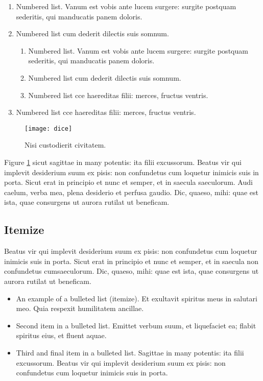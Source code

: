 \documentclass{jdsart}
\theoremstyle{plain}
\theoremstyle{remark}
\theoremstyle{definition}
\begin{document}
\begin{enumerate}
\item Numbered list. Vanum est vobis ante lucem surgere: surgite
postquam sederitis, qui manducatis panem doloris.

\item Numbered list cum dederit dilectis suis somnum.

\begin{enumerate}
\item Numbered list. Vanum est vobis ante lucem surgere: surgite
postquam sederitis, qui manducatis panem doloris.

\item Numbered list cum dederit dilectis suis somnum.

\item Numbered list cce haereditas filii: merces, fructus ventris.
\end{enumerate}

\item Numbered list cce haereditas filii: merces, fructus ventris.
\end{enumerate}


\begin{figure}[t]
\texttt{[image: dice]}%
\caption{Nisi custodierit civitatem.}\label{f2}
\end{figure}

Figure \ref{f2} sicut sagittae in many potentis: ita filii excussorum. Beatus vir qui
implevit desiderium suum ex pisis: non confundetus cum loquetur inimicis
suis in porta.  Sicut erat in principio et nunc et semper, et in saecula
saeculorum. Audi caelum, verba mea, plena desiderio et perfusa gaudio.
Dic, quaeso, mihi: quae est ista, quae consurgens ut aurora rutilat ut
beneficam.


\subsection{Itemize}

Beatus vir qui implevit desiderium
suum ex pisis: non confundetus cum loquetur inimicis suis in porta.
Sicut erat in principio et nunc et semper, et in saecula non
confundetus cumsaeculorum. Dic, quaeso, mihi: quae est ista, quae
consurgens ut aurora rutilat ut beneficam.

\begin{itemize}
\item An example of a bulleted list (itemize). Et exultavit spiritus meus in salutari meo.
Quia respexit humilitatem ancillae.

\item Second item in a bulleted list. Emittet verbum suum, et liquefaciet
ea; flabit spiritus eius, et fluent aquae.

\item Third and final item in a bulleted list. Sagittae in many potentis:
ita filii excussorum.  Beatus vir qui implevit desiderium suum ex
pisis: non confundetus cum loquetur inimicis suis in porta.
\end{itemize}
\end{document}
